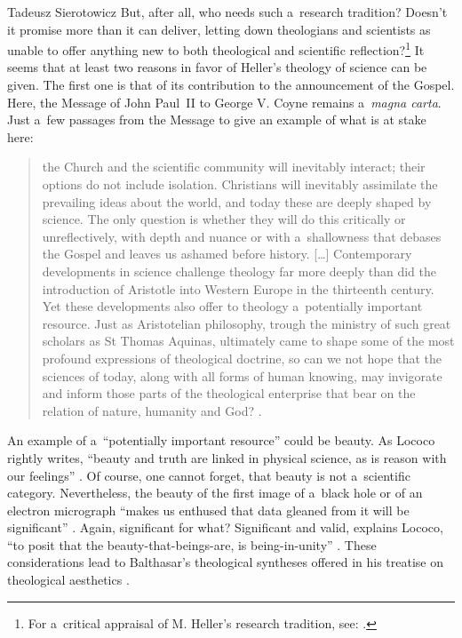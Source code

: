 \begin{artengenv}{Tadeusz Sierotowicz}
But, after all, who needs such a~research tradition? Doesn't it promise more than it can deliver, letting down theologians and scientists as unable to offer anything new to both theological and scientific reflection?\footnote{For a~critical appraisal of M. Heller's research tradition, see: 
\parencite[][]{polak_teologia_2016}.%
} It seems that at least two reasons in favor of Heller's theology of science can be given. The first one is that of its contribution to the announcement of the Gospel. Here, the Message of John Paul~II to George V. Coyne remains a~\textit{magna carta}. Just a~few passages from the Message to give an example of what is at stake here:



\begin{quote}
the Church and the scientific community will inevitably interact; their options do not include isolation. Christians will inevitably assimilate the prevailing ideas about the world, and today these are deeply shaped by science. The only question is whether they will do this critically or unreflectively, with depth and nuance or with a~shallowness that debases the Gospel and leaves us ashamed before history. […] Contemporary developments in science challenge theology far more deeply than did the introduction of Aristotle into Western Europe in the thirteenth century. Yet these developments also offer to theology a~potentially important resource. Just as Aristotelian philosophy, trough the ministry of such great scholars as St Thomas Aquinas, ultimately came to shape some of the most profound expressions of theological doctrine, so can we not hope that the sciences of today, along with all forms of human knowing, may invigorate and inform those parts of the theological enterprise that bear on the relation of nature, humanity and God? 
\parencite[][]{john_paul_ii_letter_1988}.%
\end{quote}




An example of a~``potentially important resource'' could be beauty. As Lococo rightly writes, ``beauty and truth are linked in physical science, as is reason with our feelings'' 
\parencite[][p.61]{lococo_life_2021}. %
 Of course, one cannot forget, that beauty is not a~scientific category. Nevertheless, the beauty of the first image of a~black hole 
\parencite[][]{szybka_remarks_2020} %
 or of an electron micrograph ``makes us enthused that data gleaned from it will be significant'' 
\parencite[][p.61]{lococo_life_2021}. %
 Again, significant for what? Significant and valid, explains Lococo, ``to posit that the beauty-that-beings-are, is being-in-unity'' 
\parencite[][p.62]{lococo_life_2021}. %
 These considerations lead to Balthasar's theological syntheses offered in his treatise on theological aesthetics 
\parencite[][]{balthasar_glory_2009}.%





\end{artengenv}

